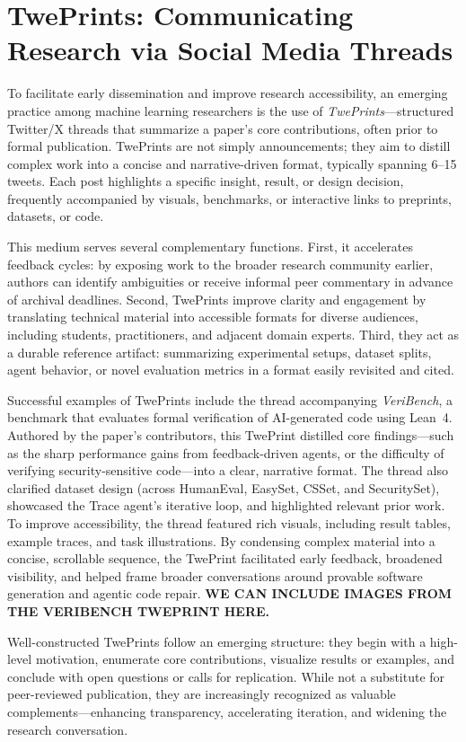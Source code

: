 
\section{TwePrints: Communicating Research via Social Media Threads}
\label{sec:tweprints}

To facilitate early dissemination and improve research accessibility, an emerging practice among machine learning researchers is the use of \textit{TwePrints}---structured Twitter/X threads that summarize a paper's core contributions, often prior to formal publication.
TwePrints are not simply announcements; they aim to distill complex work into a concise and narrative-driven format, typically spanning 6--15 tweets.
Each post highlights a specific insight, result, or design decision, frequently accompanied by visuals, benchmarks, or interactive links to preprints, datasets, or code.

This medium serves several complementary functions.
First, it accelerates feedback cycles: by exposing work to the broader research community earlier, authors can identify ambiguities or receive informal peer commentary in advance of archival deadlines.
Second, TwePrints improve clarity and engagement by translating technical material into accessible formats for diverse audiences, including students, practitioners, and adjacent domain experts.
Third, they act as a durable reference artifact: summarizing experimental setups, dataset splits, agent behavior, or novel evaluation metrics in a format easily revisited and cited.

Successful examples of TwePrints include the thread accompanying \textit{VeriBench}, a benchmark that evaluates formal verification of AI-generated code using Lean~4.
Authored by the paper's contributors, this TwePrint distilled core findings---such as the sharp performance gains from feedback-driven agents, or the difficulty of verifying security-sensitive code---into a clear, narrative format.
The thread also clarified dataset design (across HumanEval, EasySet, CSSet, and SecuritySet), showcased the Trace agent's iterative loop, and highlighted relevant prior work.
To improve accessibility, the thread featured rich visuals, including result tables, example traces, and task illustrations.
By condensing complex material into a concise, scrollable sequence, the TwePrint facilitated early feedback, broadened visibility, and helped frame broader conversations around provable software generation and agentic code repair.
\textbf{WE CAN INCLUDE IMAGES FROM THE VERIBENCH TWEPRINT HERE.}

Well-constructed TwePrints follow an emerging structure: they begin with a high-level motivation, enumerate core contributions, visualize results or examples, and conclude with open questions or calls for replication.
While not a substitute for peer-reviewed publication, they are increasingly recognized as valuable complements---enhancing transparency, accelerating iteration, and widening the research conversation.

